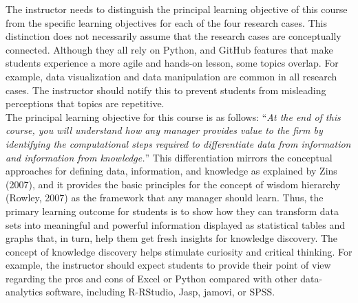 \documentclass[letterpaper,11pt]{article}
\begin{document}
The instructor needs to distinguish the principal learning objective of this course from the specific learning objectives for each of the four research cases. This distinction does not necessarily assume that the research cases are conceptually connected. Although they all rely on Python, and GitHub features that make students experience a more agile and hands-on lesson, some topics overlap. For example, data visualization and data manipulation are common in all research cases. The instructor should notify this to prevent students from misleading perceptions that topics are repetitive.\\
\vspace{0.3cm}
The principal learning objective for this course is as follows: ``\textit{At the end of this course, you will understand how any manager provides value to the firm by identifying the computational steps required to differentiate data from information and information from knowledge.}'' This differentiation mirrors the conceptual approaches for defining data, information, and knowledge as explained by Zins (2007), and it provides the basic principles for the concept of wisdom hierarchy (Rowley, 2007) as the framework that any manager should learn. Thus, the primary learning outcome for students is to show how they can transform data sets into meaningful and powerful information displayed as statistical tables and graphs that, in turn, help them get fresh insights for knowledge discovery. The concept of knowledge discovery helps stimulate curiosity and critical thinking. For example, the instructor should expect students to provide their point of view regarding the pros and cons of Excel or Python compared with other data-analytics software, including R-RStudio, Jasp, jamovi, or SPSS. \\
\vspace{0.3cm}
\end{document}
